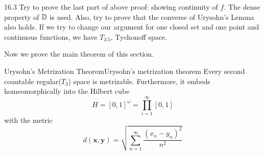 \documentclass[12pt, a4paper, twoside]{article}
\theoremstyle{plain}
\begin{document}
\begin{rem}{}{16.3}
    Try to prove the last part of above proof: showing continuity of $f$. 
    The dense property of ${\mathbb {D}}$ is used. 
    Also, try to prove that the converse of Urysohn's Lemma also holds. 
    If we try to change our argument for one closed set and one point and continuous functions, 
    we have $T_{3.5}$, Tychonoff space. 
\end{rem}

Now we prove the main theorem of this section. 

\begin{thm}{Urysohn's Metrization Theorem}{Urysohn's metrization theorem}
    Every second countable regular($T_3$) space is metrizable. 
    Furthermore, it embeds homeomorphically into the Hilbert cube 
    \[H = [0,1]^\omega = \prod_{i = 1}^{\infty} [0,1]\]
    with the metric 
    \[d(\mathbf{x}, \mathbf{y}) = \sqrt{\sum_{n=1}^{\infty}\frac{(x_n - y_n)^2}{n^2}}\]
\end{thm}
\end{document}
